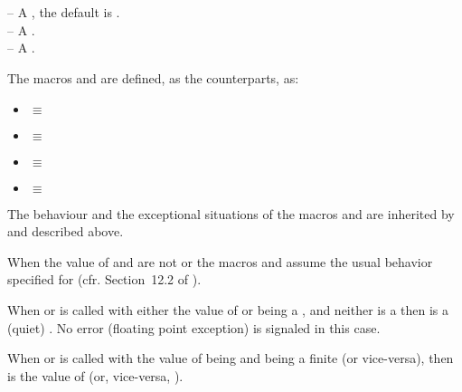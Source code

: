 \documentclass[../Arithmetic-Operations.tex]{subfiles}
\begin{document}

\DSyntax{}

    \RArrow ~ \\
    \RArrow ~ 

\DArgsNValues{}

 -- A , the default is .\\
 -- A .\\
 -- A \CL{} .\\


\DDescription{}

The macros  and  are defined,
as the \CL{} counterparts, as:
\begin{itemize}
\item {} \code{)} $\equiv$ 
   \code{(+} 
\item {} \code{)} $\equiv$ 
   \code{(-} 
\item {}  $\equiv$ 
   \code{(+} 
\item {}  $\equiv$ 
   \code{(-} 
\end{itemize}

The behaviour and the exceptional situations of the macros  and
 are inherited by \code{+} and \code{-} described above.

When the value of  and  are not
 or  the macros  and
 assume the usual behavior specified for \CL{} (cfr.
Section~12.2 of \cite{1996:ANSIHyperSpec}).

When  or  is called with either the value of
 or  being a , and
neither is a  then  is a
(quiet) . No error (floating point exception) is signaled in
this case.

When  or  is called with the value of
 being   and  being a
finite  (or vice-versa), then  is the
value of  (or, vice-versa, ).
\end{document}
